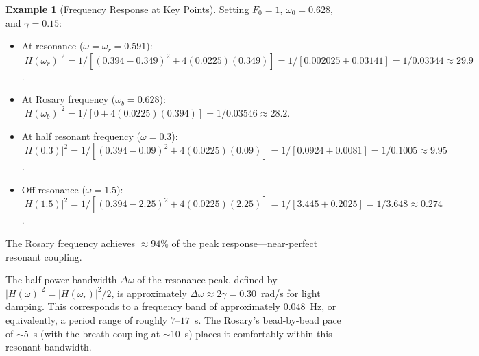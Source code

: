 \documentclass[journal]{IEEEtran}
\theoremstyle{definition}
\newtheorem{example}[theorem]{Example}
\theoremstyle{remark}
\begin{document}
\begin{example}[Frequency Response at Key Points]\label{ex:frequency}
Setting $F_0 = 1$, $\omega_0 = 0.628$, and $\gamma = 0.15$:
\begin{itemize}
\item At resonance ($\omega = \omega_r = 0.591$): $|H(\omega_r)|^2 = 1/[(0.394 - 0.349)^2 + 4(0.0225)(0.349)] = 1/[0.002025 + 0.03141] = 1/0.03344 \approx 29.9$.
\item At Rosary frequency ($\omega_b = 0.628$): $|H(\omega_b)|^2 = 1/[0 + 4(0.0225)(0.394)] = 1/0.03546 \approx 28.2$.
\item At half resonant frequency ($\omega = 0.3$): $|H(0.3)|^2 = 1/[(0.394 - 0.09)^2 + 4(0.0225)(0.09)] = 1/[0.0924 + 0.0081] = 1/0.1005 \approx 9.95$.
\item Off-resonance ($\omega = 1.5$): $|H(1.5)|^2 = 1/[(0.394 - 2.25)^2 + 4(0.0225)(2.25)] = 1/[3.445 + 0.2025] = 1/3.648 \approx 0.274$.
\end{itemize}
The Rosary frequency achieves $\approx 94\%$ of the peak response---near-perfect resonant coupling.
\end{example}

The half-power bandwidth $\Delta\omega$ of the resonance peak, defined by $|H(\omega)|^2 = |H(\omega_r)|^2/2$, is approximately $\Delta\omega \approx 2\gamma = 0.30$~rad/s for light damping. This corresponds to a frequency band of approximately $0.048$~Hz, or equivalently, a period range of roughly $7$--$17$~s. The Rosary's bead-by-bead pace of $\sim$5~s (with the breath-coupling at $\sim$10~s) places it comfortably within this resonant bandwidth.
\end{document}
